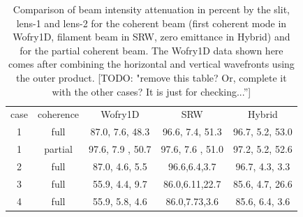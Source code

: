 \documentclass{iucr}              %
\newcommand{\todo}[1]{{\color{red}[TODO: "#1'']}}
\newcommand{\inblue}[1]{{\color{blue}#1}}
\begin{document}
\begin{table}[]
    \label{table:absorption}
    \caption{Comparison of beam intensity attenuation in percent by the slit, lens-1 and lens-2 for the coherent beam (first coherent mode in Wofry1D, filament beam in SRW, zero emittance in Hybrid) and for the partial coherent beam.
    The Wofry1D data shown here comes after combining the horizontal and vertical wavefronts using the outer product. 
    \todo{remove this table? Or, complete it with the other cases? It is just for checking...}
    }
    \centering
    
    \begin{tabular}{c|c|c|c|c}
case  & 
coherence &
Wofry1D & 
SRW  & 
Hybrid \\
1   &  full &
87.0, 7.6, 48.3 &
96.6, 7.4, 51.3 & 
96.7, 5.2, 53.0 \\
1     &  partial &
97.6,  7.9 , 50.7 &
97.6,  7.6 , 51.0  &
97.2, 5.2, 52.6\\
2     &  full & 
87.0, 4.6, 5.5  & 
96.6,6.4,3.7 &
96.7, 4.3, 3.3 \\
3     &  full & 
55.9, 4.4, 9.7 & 
86.0,6.11,22.7 &
85.6, 4.7, 26.6 \\
4     &  full & 
55.9, 5.8, 4.6 & 
86.0,7.73,3.6 &
85.6, 6.4, 3.6
    \end{tabular}
    
    
\end{table}
\end{document}
